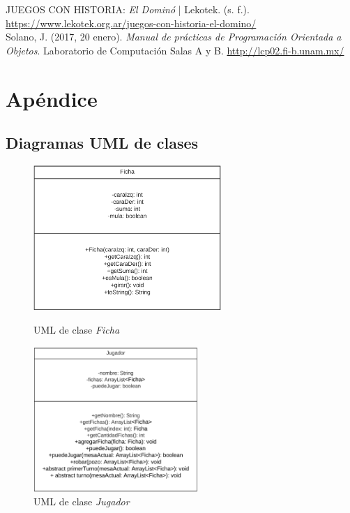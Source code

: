 \documentclass[12pt]{article}
\begin{document}
  JUEGOS CON HISTORIA: \textit{El Dominó} | Lekotek. (s. f.). \url{https://www.lekotek.org.ar/juegos-con-historia-el-domino/} \\

  Solano, J. (2017, 20 enero). \textit{Manual de prácticas de Programación Orientada a Objetos}. Laboratorio de Computación Salas A y B. \url{http://lcp02.fi-b.unam.mx/} 

  \newpage
  \section{Apéndice}
  \subsection{Diagramas UML de clases}
  \begin{figure}[h!]
    \centering
    \begin{minipage}[l]{0.45\textwidth}
      \centering
      \includegraphics[height=5.5cm]{uml1.png}
      \caption{UML de clase \textit{Ficha}}
    \end{minipage}
    \begin{minipage}[r]{0.45\textwidth}
      \centering
      \includegraphics[height=5.5cm]{uml2.png}
      \caption{UML de clase \textit{Jugador}}
    \end{minipage}
  \end{figure}
\end{document}
